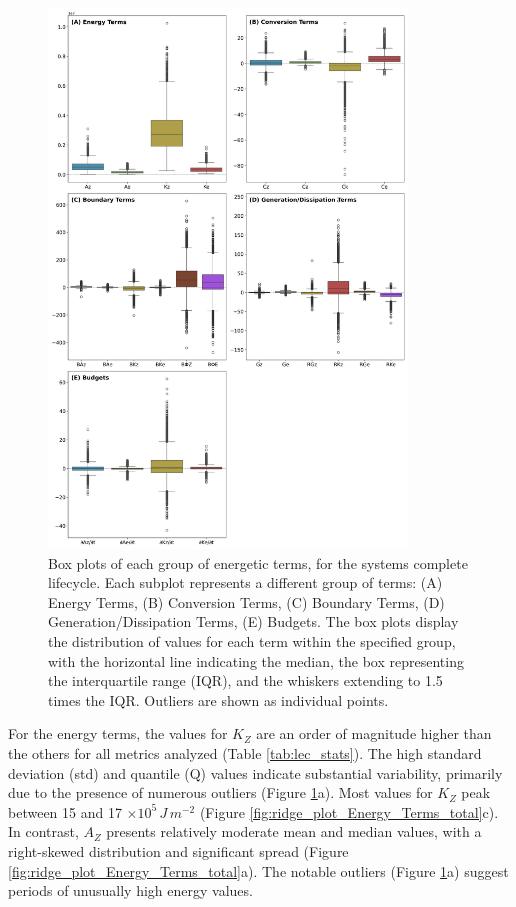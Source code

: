 \begin{figure}[!htbp]
\centering
\includegraphics[width=0.85\textwidth]{figs_5/box_plot_Total_all_groups.png}
\caption[Box plots - Complete Lifecycle]{Box plots of each group of energetic terms, for the systems complete lifecycle. Each subplot represents a different group of terms: (A) Energy Terms, (B) Conversion Terms, (C) Boundary Terms, (D) Generation/Dissipation Terms, (E) Budgets. The box plots display the distribution of values for each term within the specified group, with the horizontal line indicating the median, the box representing the interquartile range (IQR), and the whiskers extending to 1.5 times the IQR. Outliers are shown as individual points.}
\label{fig:boxplot_energy_total}
\end{figure}

For the energy terms, the values for $K_Z$ are an order of magnitude higher than the others for all metrics analyzed (Table \ref{tab:lec_stats}). The high standard deviation (std) and quantile (Q) values indicate substantial variability, primarily due to the presence of numerous outliers (Figure \ref{fig:boxplot_energy_total}a). Most values for $K_Z$ peak between 15 and 17 $\times 10^5 \, J \, m^{-2}$ (Figure \ref{fig:ridge_plot_Energy_Terms_total}c). In contrast, $A_Z$ presents relatively moderate mean and median values, with a right-skewed distribution and significant spread (Figure \ref{fig:ridge_plot_Energy_Terms_total}a). The notable outliers (Figure \ref{fig:boxplot_energy_total}a) suggest periods of unusually high energy values.

